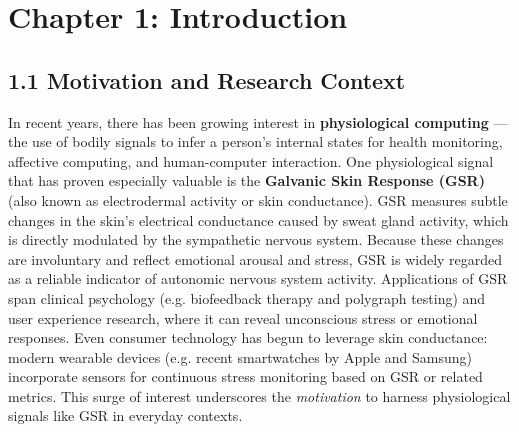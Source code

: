 \label{chap:1}

\chapter{Chapter 1: Introduction}

\section{1.1 Motivation and Research Context}

In recent years, there has been growing interest in \textbf{physiological
computing} --- the use of bodily signals to infer a person's internal
states for health monitoring, affective computing, and human-computer
interaction. One physiological signal that has proven especially
valuable is the \textbf{Galvanic Skin Response (GSR)} (also known as
electrodermal activity or skin conductance). GSR measures subtle changes
in the skin's electrical conductance caused by sweat gland activity,
which is directly modulated by the sympathetic nervous
system\cite{Boucsein2012}.
Because these changes are involuntary and reflect emotional arousal and
stress, GSR is widely regarded as a reliable indicator of autonomic
nervous system
activity\cite{Boucsein2012}.
Applications of GSR span clinical psychology (e.g. biofeedback therapy
and polygraph testing) and user experience research, where it can reveal
unconscious stress or emotional responses. Even consumer technology has
begun to leverage skin conductance: modern wearable devices (e.g. recent
smartwatches by Apple and Samsung) incorporate sensors for continuous
stress monitoring based on GSR or related
metrics\cite{AppleHealthWatch2019}\cite{SamsungHealth2020}.
This surge of interest underscores the \textit{motivation} to harness
physiological signals like GSR in everyday contexts.

